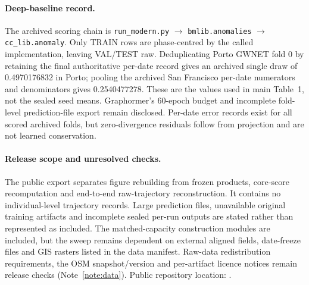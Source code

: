 \paragraph{Deep-baseline record.} The archived scoring chain is \texttt{run\_modern.py} $\rightarrow$ \texttt{bmlib.anomalies} $\rightarrow$ \texttt{cc\_lib.anomaly}. Only TRAIN rows are phase-centred by the called implementation, leaving VAL/TEST raw. Deduplicating Porto GWNET fold 0 by retaining the final authoritative per-date record gives an archived single draw of 0.4970176832 in Porto; pooling the archived San Francisco per-date numerators and denominators gives 0.2540477278. These are the values used in main Table~1, not the sealed seed means. Graphormer's 60-epoch budget and incomplete fold-level prediction-file export remain disclosed. Per-date error records exist for all scored archived folds, but zero-divergence residuals follow from projection and are not learned conservation.

\paragraph{Release scope and unresolved checks.} The public export separates figure rebuilding from frozen products, core-score recomputation and end-to-end raw-trajectory reconstruction. It contains no individual-level trajectory records. Large prediction files, unavailable original training artifacts and incomplete sealed per-run outputs are stated rather than represented as included. The matched-capacity construction modules are included, but the sweep remains dependent on external aligned fields, date-freeze files and GIS rasters listed in the data manifest. Raw-data redistribution requirements, the OSM snapshot/version and per-artifact licence notices remain release checks (Note~\ref{note:data}). Public repository location: \repositorylocation.
